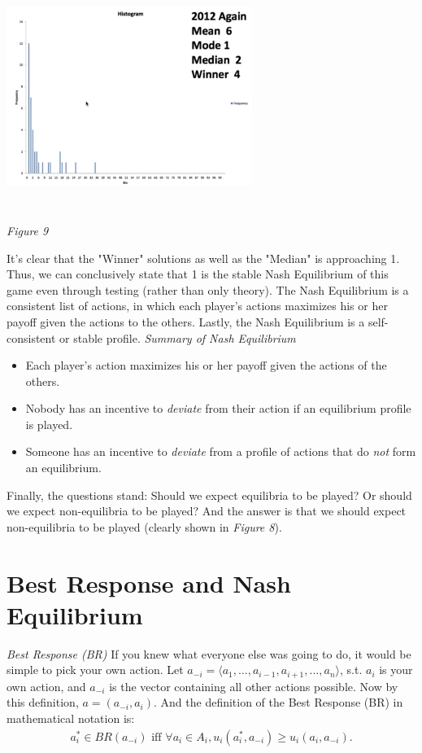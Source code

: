 \documentclass{article}
\begin{document}
\begin{center}
    \includegraphics[width = 8cm, height = 8cm]{IMG_009.png} \\
    \emph{Figure 9}
\end{center}
It's clear that the "Winner" solutions as well as the "Median" is approaching 1. Thus, we can conclusively state that 1 is the stable Nash Equilibrium of this game even through testing (rather than only theory). The Nash Equilibrium is a consistent list of actions, in which each player's actions maximizes his or her payoff given the actions to the others. Lastly, the Nash Equilibrium is a self-consistent or stable profile. 
\vskip 0.1in
\emph{Summary of Nash Equilibrium}
\vskip 0.1in
\begin{itemize}
    \item Each player's action maximizes his or her payoff given the actions of the others.
    \item Nobody has an incentive to \emph{deviate} from their action if an equilibrium profile is played.
    \item Someone has an incentive to \emph{deviate} from a profile of actions that do \emph{not} form an equilibrium. 
\end{itemize}
Finally, the questions stand: Should we expect equilibria to be played? Or should we expect non-equilibria to be played? And the answer is that we should expect non-equilibria to be played (clearly shown in \emph{Figure 8}). 

\section{Best Response and Nash Equilibrium}

\emph{Best Response (BR)}
\vskip 0.1in
If you knew what everyone else was going to do, it would be simple to pick your own action. Let \(a_{-i} = \langle a_{1}, ..., a_{i-1}, a_{i+1}, ..., a_{n}\rangle\), s.t. \(a_{i}\) is your own action, and \(a_{-i}\) is the vector containing all other actions possible. Now by this definition, \(a = (a_{-i}, a_{i})\). And the definition of the Best Response (BR) in mathematical notation is:
\begin{align}
    a_{i}^{*} \in BR(a_{-i}) \text{ iff } \forall a_{i} \in A_{i}, u_{i}(a_{i}^{*}, a_{-i}) \geq u_{i}(a_{i}, a_{-i}).
\end{align}
\end{document}
